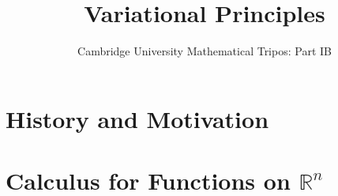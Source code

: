 \documentclass{article}
\title{Variational Principles}
\author{Cambridge University Mathematical Tripos: Part IB}
\begin{document}
\maketitle

\tableofcontentsnewpage{}

\section{History and Motivation}

\section{Calculus for Functions on \(\mathbb R^n\)}

\end{document}
